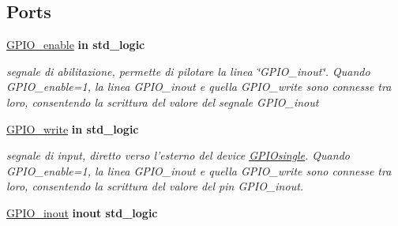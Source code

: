 \subsection*{Ports}
 \begin{DoxyCompactItemize}
\item 
\hypertarget{group___g_p_i_o-single_ga0ae7f62d9fa2c19d7ad2ad7574b58871}{\hyperlink{group___g_p_i_o-single_ga0ae7f62d9fa2c19d7ad2ad7574b58871}{G\+P\+I\+O\+\_\+enable}  {\bfseries {\bfseries \textcolor{vhdlchar}{in}\textcolor{vhdlchar}{ }}} {\bfseries \textcolor{vhdlchar}{std\+\_\+logic}\textcolor{vhdlchar}{ }} }\label{group___g_p_i_o-single_ga0ae7f62d9fa2c19d7ad2ad7574b58871}

\begin{DoxyCompactList}\small\item\em segnale di abilitazione, permette di pilotare la linea \char`\"{}\+G\+P\+I\+O\+\_\+inout\char`\"{}. Quando G\+P\+I\+O\+\_\+enable=1, la linea G\+P\+I\+O\+\_\+inout e quella G\+P\+I\+O\+\_\+write sono connesse tra loro, consentendo la scrittura del valore del segnale G\+P\+I\+O\+\_\+inout \end{DoxyCompactList}\item 
\hypertarget{group___g_p_i_o-single_ga20547939f304c722cb29df650d7ca7ef}{\hyperlink{group___g_p_i_o-single_ga20547939f304c722cb29df650d7ca7ef}{G\+P\+I\+O\+\_\+write}  {\bfseries {\bfseries \textcolor{vhdlchar}{in}\textcolor{vhdlchar}{ }}} {\bfseries \textcolor{vhdlchar}{std\+\_\+logic}\textcolor{vhdlchar}{ }} }\label{group___g_p_i_o-single_ga20547939f304c722cb29df650d7ca7ef}

\begin{DoxyCompactList}\small\item\em segnale di input, diretto verso l'esterno del device \hyperlink{class_g_p_i_osingle}{G\+P\+I\+Osingle}. Quando G\+P\+I\+O\+\_\+enable=1, la linea G\+P\+I\+O\+\_\+inout e quella G\+P\+I\+O\+\_\+write sono connesse tra loro, consentendo la scrittura del valore del pin G\+P\+I\+O\+\_\+inout. \end{DoxyCompactList}\item 
\hypertarget{group___g_p_i_o-single_ga979707b3e6ce3920d653c07c91e80f70}{\hyperlink{group___g_p_i_o-single_ga979707b3e6ce3920d653c07c91e80f70}{G\+P\+I\+O\+\_\+inout}  {\bfseries {\bfseries \textcolor{vhdlchar}{inout}\textcolor{vhdlchar}{ }}} {\bfseries \textcolor{vhdlchar}{std\+\_\+logic}\textcolor{vhdlchar}{ }} }\label{group___g_p_i_o-single_ga979707b3e6ce3920d653c07c91e80f70}


\end{DoxyCompactItemize}
